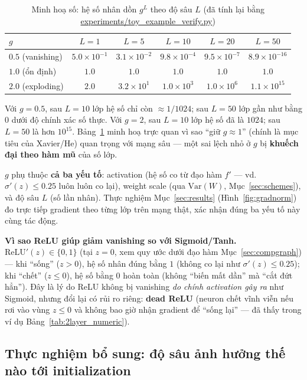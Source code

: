 \documentclass[12pt,a4paper]{report}
\begin{document}
\begin{table}[htbp]
\centering
\caption{Minh hoạ số: hệ số nhân dồn $g^L$ theo độ sâu $L$ (đã tính lại
bằng \url{experiments/toy_example_verify.py})}
\begin{tabular}{@{}lccccc@{}}
\toprule
$g$ & $L=1$ & $L=5$ & $L=10$ & $L=20$ & $L=50$ \\
\midrule
$0.5$ (vanishing) & $5.0\times10^{-1}$ & $3.1\times10^{-2}$ & $9.8\times10^{-4}$ & $9.5\times10^{-7}$ & $8.9\times10^{-16}$ \\
$1.0$ (ổn định) & $1.0$ & $1.0$ & $1.0$ & $1.0$ & $1.0$ \\
$2.0$ (exploding) & $2.0$ & $3.2\times10^{1}$ & $1.0\times10^{3}$ & $1.0\times10^{6}$ & $1.1\times10^{15}$ \\
\bottomrule
\end{tabular}
\label{tab:ge_numeric}
\end{table}

Với $g=0.5$, sau $L=10$ lớp hệ số chỉ còn $\approx1/1024$; sau $L=50$ lớp
gần như bằng $0$ dưới độ chính xác số thực. Với $g=2$, sau $L=10$ lớp hệ số
đã là $1024$; sau $L=50$ là hơn $10^{15}$. Bảng~\ref{tab:ge_numeric} minh
hoạ trực quan vì sao ``giữ $g\approx1$'' (chính là mục tiêu của Xavier/He)
quan trọng với mạng sâu --- một sai lệch nhỏ ở $g$ bị \textbf{khuếch đại
theo hàm mũ} của số lớp.

$g$ phụ thuộc \textbf{cả ba yếu tố}: activation (hệ số co từ đạo hàm $f'$
--- vd. $\sigma'(z)\le0.25$ luôn luôn co lại), weight scale (qua
$\mathrm{Var}(W)$, Mục~\ref{sec:schemes}), và độ sâu $L$ (số lần nhân).
Thực nghiệm Mục~\ref{sec:results} (Hình~\ref{fig:gradnorm}) đo trực tiếp
gradient theo từng lớp trên mạng thật, xác nhận đúng ba yếu tố này cùng
tác động.

\par\noindent\textbf{Vì sao ReLU giúp giảm vanishing so với Sigmoid/Tanh.}\enspace 
$\mathrm{ReLU}'(z)\in\{0,1\}$ (tại $z=0$, xem quy ước dưới đạo hàm
Mục~\ref{sec:compgraph}) --- khi ``sống'' ($z>0$), hệ số nhân đúng bằng
$1$ (không co lại như $\sigma'(z)\le0.25$); khi ``chết'' ($z\le0$), hệ số
bằng $0$ hoàn toàn (không ``biến mất dần'' mà ``cắt đứt hẳn''). Đây là lý do
ReLU không bị vanishing \emph{do chính activation gây ra} như Sigmoid,
nhưng đổi lại có rủi ro riêng: \textbf{dead ReLU} (neuron chết vĩnh viễn
nếu rơi vào vùng $z\le0$ và không bao giờ nhận gradient để ``sống lại''
--- đã thấy trong ví dụ Bảng~\ref{tab:2layer_numeric}).
\par

\subsection{Thực nghiệm bổ sung: độ sâu ảnh hưởng thế nào tới initialization}
\label{sec:depthexp}
\end{document}
